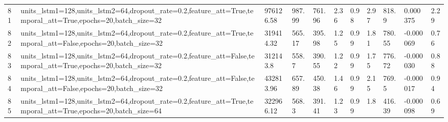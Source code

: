 \begin{longtable}{C{0.8cm} L{2cm} C{1.15cm} C{1.15cm} C{1.15cm} C{1.15cm} C{0.85cm} C{1.25cm} C{1.2cm} C{1.5cm} C{1.0cm}}
81 & units\_lstm1=128,\newline units\_lstm2=64,\newline dropout\_rate=0.2,\newline feature\_att=True,\newline temporal\_att=True,\newline epochs=20,\newline batch\_size=32 & 976126.58 & 987.99 & 761.96 & 2.36 & 0.98 & 2.97 & 818.9 & 0.000375 & 2.29 \\
82 & units\_lstm1=128,\newline units\_lstm2=64,\newline dropout\_rate=0.2,\newline feature\_att=True,\newline temporal\_att=False,\newline epochs=20,\newline batch\_size=32 & 319414.32 & 565.17 & 395.98 & 1.25 & 0.99 & 1.81 & 780.55 & -0.000069 & 0.76 \\
83 & units\_lstm1=128,\newline units\_lstm2=64,\newline dropout\_rate=0.2,\newline feature\_att=False,\newline temporal\_att=True,\newline epochs=20,\newline batch\_size=32 & 312143.8 & 558.7 & 390.55 & 1.22 & 0.99 & 1.75 & 776.72 & -0.000030 & 0.88 \\
84 & units\_lstm1=128,\newline units\_lstm2=64,\newline dropout\_rate=0.2,\newline feature\_att=False,\newline temporal\_att=False,\newline epochs=20,\newline batch\_size=32 & 432813.96 & 657.89 & 450.38 & 1.46 & 0.99 & 2.15 & 769.5 & -0.000017 & 0.94 \\
85 & units\_lstm1=128,\newline units\_lstm2=64,\newline dropout\_rate=0.2,\newline feature\_att=True,\newline temporal\_att=True,\newline epochs=20,\newline batch\_size=64 & 322966.12 & 568.3 & 391.41 & 1.23 & 0.99 & 1.8 & 416.39 & -0.000098 & 0.69 \\

\end{longtable}

